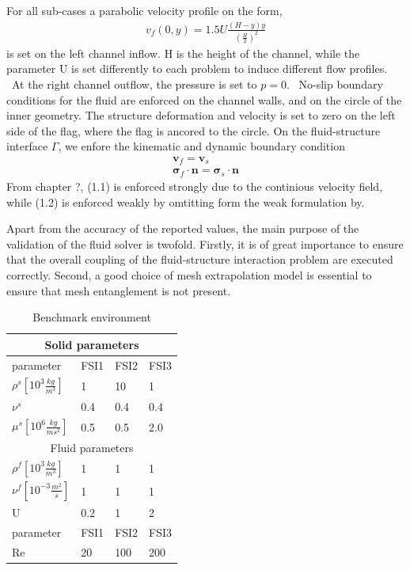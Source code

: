  For all sub-cases
a parabolic velocity profile on the form,
\begin{align*}
v_f(0, y) = 1.5 U\frac{(H -y)y}{(\frac{H}{2})^2}
\end{align*}
is set on the left channel inflow. H is the height of the channel, while the parameter U is set differently to each problem to induce different flow profiles. \
At the right channel outflow, the pressure is set to $p = 0$. \
No-slip boundary conditions for the fluid are enforced on the channel walls, and on the circle of the inner geometry.
The structure deformation and velocity is set to zero on the left side of the flag, where the flag is ancored to the circle. On the fluid-structure interface $\Gamma$, we enfore the kinematic and dynamic boundary condition
\begin{align}
\mathbf{v}_f = \mathbf{v}_s \\
\mathbf{\sigma}_f \cdot \mathbf{n} = \mathbf{\sigma}_s \cdot \mathbf{n}
\end{align}
From chapter ?,  (1.1) is enforced strongly due to the continious velocity field, while (1.2) is enforced weakly by omtitting form the weak formulation by.



Apart from the accuracy of the reported values, the main purpose of the validation of the fluid solver is twofold. Firstly, it is of great importance to ensure that the overall coupling of the fluid-structure interaction problem are executed correctly. Second, a good choice of mesh extrapolation model is essential to ensure that mesh entanglement is not present. 


\begin{table}[h!]
\centering
\caption{Benchmark environment}
\label{my-label}
\begin{tabular}{ |p{3cm}||p{2cm}|p{2cm}|p{2cm}|  }
 \hline
 \multicolumn{4}{|c|}{Solid parameters} \\
 \hline
 parameter              & FSI1 & FSI2 & FSI3 \\
 \hline
 $\rho^s [10^{3} \frac{kg}{m^3}]$ & 1    & 10   & 1    \\
$\nu^s$ & 0.4  & 0.4  & 0.4  \\
$\mu^s  [10^{6}\frac{kg}{ms^2}]$  & 0.5  & 0.5  & 2.0  \\
 \hline
 \multicolumn{4}{|c|}{Fluid parameters} \\
 \hline
$\rho^f [10^{3}\frac{kg}{m^3}]$ & 1    & 1    & 1    \\
$\nu^f  [10^{-3}\frac{m^2}{s}]$  & 1    & 1    & 1    \\
U                      & 0.2  & 1    & 2    \\
parameter              & FSI1 & FSI2 & FSI3 \\
Re                     & 20   & 100  & 200 \\
\hline
\end{tabular}
\end{table}

